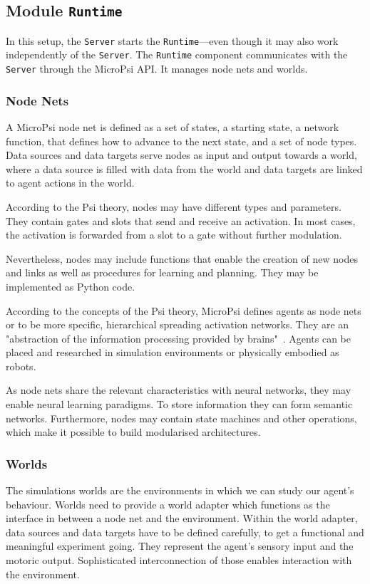         \subsection{Module \texttt{Runtime}}
In this setup, the \texttt{Server} starts the \texttt{Runtime}---even though it may also work independently of the \texttt{Server}. The \texttt{Runtime} component communicates with the \texttt{Server} through the MicroPsi API. It manages node nets and worlds.

        \subsubsection{Node Nets}
A MicroPsi node net is defined as a set of states, a starting state, a network function, that defines how to advance to the next state, and a set of node types. Data sources and data targets serve nodes as input and output towards a world, where a data source is filled with data from the world and data targets are linked to agent actions in the world.

According to the Psi theory, nodes may have different types and parameters. They contain gates and slots that send and receive an activation. In most cases, the activation is forwarded from a slot to a gate without further modulation.

Nevertheless, nodes may include functions that enable the creation of new nodes and links as well as procedures for learning and planning. They may be implemented as Python code.

According to the concepts of the Psi theory, MicroPsi defines agents as node nets or to be more specific, hierarchical spreading activation networks. They are an "abstraction of the information processing provided by brains"~\cite{conf/agi/Bach12}. Agents can be placed and researched in simulation environments or physically embodied as robots.

As node nets share the relevant characteristics with neural networks, they may enable neural learning paradigms. To store information they can form semantic networks. Furthermore, nodes may contain state machines and other operations, which make it possible to build modularised architectures.

        \subsubsection{Worlds}
The simulations worlds are the environments in which we can study our agent's behaviour. Worlds need to provide a world adapter which functions as the interface in between a node net and the environment. Within the world adapter, data sources and data targets have to be defined carefully, to get a functional and meaningful experiment going. They represent the agent's sensory input and the motoric output. Sophisticated interconnection of those enables interaction with the environment.

